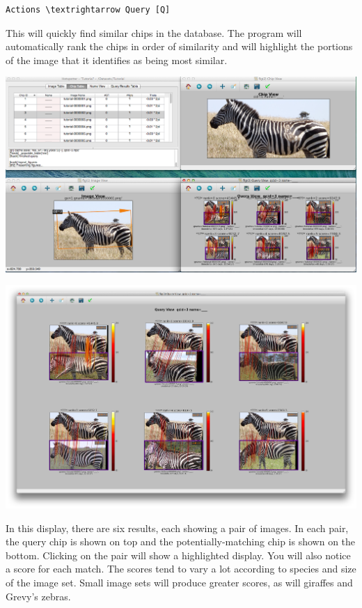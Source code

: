 \documentclass[a4paper,10pt]{article}
\begin{document}
        \begin{Verbatim}[commandchars=\\\{\}]
        Actions \textrightarrow Query [Q]
        \end{Verbatim}
        
\noindent
        This will quickly find similar chips in the database.  The program will
        automatically rank the chips in order of similarity and will highlight
        the portions of the image that it identifies as being most
        similar.

        \begin{center}
            \includegraphics[scale=0.2]{images/query-all.png}

        \;

            \includegraphics[scale=0.212]{images/query-result.png}
        \end{center}
        In this display, there are six results, each showing a pair of images.  In each
        pair, the query chip is shown on top and the
        potentially-matching chip is shown on the bottom.  Clicking on
        the pair will show a highlighted display.  You will also
        notice a score for each match.  The scores tend to vary a lot
        according to species and size of the image set.  Small image
        sets will produce greater scores, as will giraffes and Grevy's
        zebras. 
     
\end{document}
